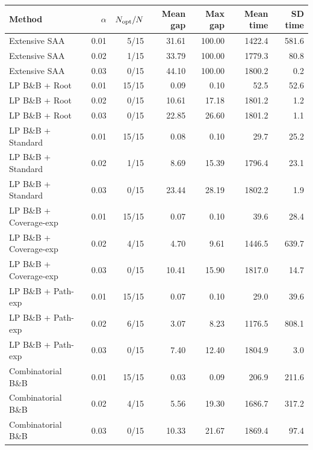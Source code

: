 \begin{tabular}{lrrrrrr}
\toprule
Method & $\alpha$ & $N_{\rm opt}/N$ & Mean gap & Max gap & Mean time & SD time \\
\midrule
Extensive SAA & 0.01 & 5/15 & 31.61 & 100.00 & 1422.4 & 581.6 \\
Extensive SAA & 0.02 & 1/15 & 33.79 & 100.00 & 1779.3 & 80.8 \\
Extensive SAA & 0.03 & 0/15 & 44.10 & 100.00 & 1800.2 & 0.2 \\
\addlinespace
LP B\&B + Root & 0.01 & 15/15 & 0.09 & 0.10 & 52.5 & 52.6 \\
LP B\&B + Root & 0.02 & 0/15 & 10.61 & 17.18 & 1801.2 & 1.2 \\
LP B\&B + Root & 0.03 & 0/15 & 22.85 & 26.60 & 1801.2 & 1.1 \\
\addlinespace
LP B\&B + Standard & 0.01 & 15/15 & 0.08 & 0.10 & 29.7 & 25.2 \\
LP B\&B + Standard & 0.02 & 1/15 & 8.69 & 15.39 & 1796.4 & 23.1 \\
LP B\&B + Standard & 0.03 & 0/15 & 23.44 & 28.19 & 1802.2 & 1.9 \\
\addlinespace
LP B\&B + Coverage-exp & 0.01 & 15/15 & 0.07 & 0.10 & 39.6 & 28.4 \\
LP B\&B + Coverage-exp & 0.02 & 4/15 & 4.70 & 9.61 & 1446.5 & 639.7 \\
LP B\&B + Coverage-exp & 0.03 & 0/15 & 10.41 & 15.90 & 1817.0 & 14.7 \\
\addlinespace
LP B\&B + Path-exp & 0.01 & 15/15 & 0.07 & 0.10 & 29.0 & 39.6 \\
LP B\&B + Path-exp & 0.02 & 6/15 & 3.07 & 8.23 & 1176.5 & 808.1 \\
LP B\&B + Path-exp & 0.03 & 0/15 & 7.40 & 12.40 & 1804.9 & 3.0 \\
\addlinespace
Combinatorial B\&B & 0.01 & 15/15 & 0.03 & 0.09 & 206.9 & 211.6 \\
Combinatorial B\&B & 0.02 & 4/15 & 5.56 & 19.30 & 1686.7 & 317.2 \\
Combinatorial B\&B & 0.03 & 0/15 & 10.33 & 21.67 & 1869.4 & 97.4 \\
\bottomrule
\end{tabular}
